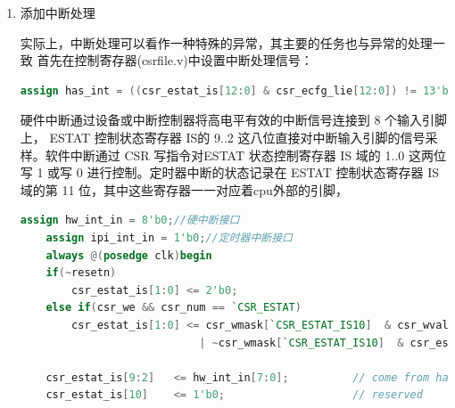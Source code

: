 \documentclass[11pt]{article}
\begin{document}
\begin{enumerate}
添加控制信号id\_read\_counter, id\_read\_counter\_low, id\_read\_TID，分别用于记录指令是否需要读取计数器的值，是否要读取计数器的低32位，指令是否要读取计数器ID。
\begin{lstlisting}[language=verilog]
    assign id_read_counter     = inst_rdcntvl_w | inst_rdcntvh_w;
    assign id_read_counter_low = inst_rdcntvl_w;
    assign id_read_TID         = inst_rdcntid; 
\end{lstlisting}
计数器的值在EX阶段根据ex\_read\_counter\_low完成读入。
\begin{lstlisting}[language=verilog]
// 读计数器
    assign ex_counter_result = ex_read_counter_low ? counter[31:0] : counter[63:32];            //处理rdcntvl.w rdcntvh.w指令
\end{lstlisting}
TID的值在WB阶段完成读入。
\begin{lstlisting}[language=verilog]
    assign final_rf_wdata = wb_csr_re   ? csr_rvalue : 
                            wb_read_TID ? csr_rvalue : wb_rf_wdata;             //add csr_tid_rvalue for rdcntid.w
\end{lstlisting}

\item 添加中断处理

 实际上，中断处理可以看作一种特殊的异常，其主要的任务也与异常的处理一致
 首先在控制寄存器(csrfile.v)中设置中断处理信号：
 \begin{lstlisting}[language=verilog]
    assign has_int = ((csr_estat_is[12:0] & csr_ecfg_lie[12:0]) != 13'b0)&& (csr_crmd_ie == 1'b1);
 \end{lstlisting}
 硬件中断通过设备或中断控制器将高电平有效的中断信号连接到 8 个输入引脚上，
ESTAT 控制状态寄存器 IS的 9..2 这八位直接对中断输入引脚的信号采样。软件中断通过 CSR 写指令对ESTAT 状态控制寄存器 IS 域的 1..0 
这两位写 1 或写 0 进行控制。定时器中断的状态记录在 ESTAT 控制状态寄存器 IS 域的第 11 位，其中这些寄存器一一对应着cpu外部的引脚，
\begin{lstlisting}[language=verilog]
    assign hw_int_in = 8'b0;//硬中断接口
    assign ipi_int_in = 1'b0;//定时器中断接口
    always @(posedge clk)begin
    if(~resetn)
        csr_estat_is[1:0] <= 2'b0;
    else if(csr_we && csr_num == `CSR_ESTAT)
        csr_estat_is[1:0] <= csr_wmask[`CSR_ESTAT_IS10]  & csr_wvalue[`CSR_ESTAT_IS10]
                            | ~csr_wmask[`CSR_ESTAT_IS10]  & csr_estat_is[1:0];

    csr_estat_is[9:2]   <= hw_int_in[7:0];          // come from hardware sampling
    csr_estat_is[10]    <= 1'b0;                    // reserved


\end{lstlisting}
\end{enumerate}
\end{document}
